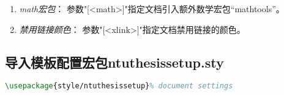 \begin{enumerate}
\begin{lstlisting}[language=tex]
            \RequirePackage{enumitem}% configure the enumerate environment
            \setlist[enumerate]{wide=\parindent}% only indent the first line
            \setlist[itemize]{wide=\parindent}% only indent the first line
            \setlist{nosep}% default text spacing
            \RequirePackage{listings}% source code
            \RequirePackage{algpseudocode,algorithm,algorithmicx}% algorithm
            \providecommand{\algname}{Algorithm}%
            \def\ALG@name{\algname}% rename label
        \end{lstlisting}%
    \item \emph{math宏包}： 参数"[<math>]"指定文档引入额外数学宏包“mathtools”。
    \item \emph{禁用链接颜色}： 参数"[<xlink>]"指定文档禁用链接的颜色。
\end{enumerate}




\subsection{导入模板配置宏包ntuthesissetup.sty}
\begin{lstlisting}[language=tex]
        \usepackage{style/ntuthesissetup}% document settings
 \end{lstlisting}%



 
